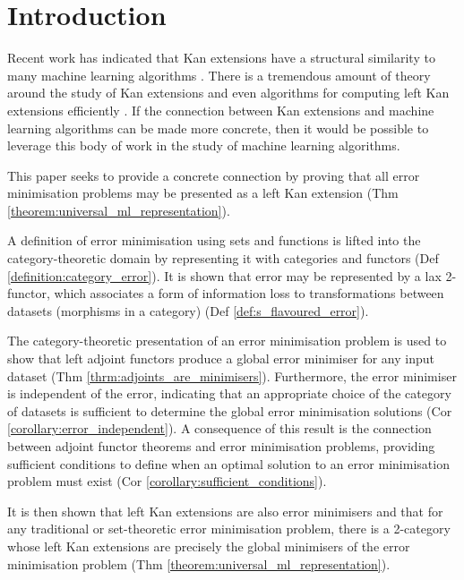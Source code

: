 \section{Introduction}

Recent work has indicated that Kan extensions have a structural similarity to many machine learning algorithms \cite{shieblerKanExtensionsData2022, pugh_using_2023}. There is a tremendous amount of theory around the study of Kan extensions \cite{perrone_kan_2022, Kelly2005} and even algorithms for computing left Kan extensions efficiently \cite{meyers_fast_2022}. If the connection between Kan extensions and machine learning algorithms can be made more concrete, then it would be possible to leverage this body of work in the study of machine learning algorithms. 

This paper seeks to provide a concrete connection by proving that all error minimisation problems may be presented as a left Kan extension (Thm \ref{theorem:universal_ml_representation}).

A definition of error minimisation using sets and functions is lifted into the category-theoretic domain by representing it with categories and functors (Def \ref{definition:category_error}). It is shown that error may be represented by a lax 2-functor, which associates a form of information loss to transformations between datasets (morphisms in a category) (Def \ref{def:s_flavoured_error}).

The category-theoretic presentation of an error minimisation problem is used to show that left adjoint functors produce a global error minimiser for any input dataset (Thm \ref{thrm:adjoints_are_minimisers}). Furthermore, the error minimiser is independent of the error, indicating that an appropriate choice of the category of datasets is sufficient to determine the global error minimisation solutions (Cor \ref{corollary:error_independent}). A consequence of this result is the connection between adjoint functor theorems \cite{porst_history_2024} and error minimisation problems, providing sufficient conditions to define when an optimal solution to an error minimisation problem must exist (Cor \ref{corollary:sufficient_conditions}).

It is then shown that left Kan extensions are also error minimisers and that for any traditional or set-theoretic error minimisation problem, there is a 2-category whose left Kan extensions are precisely the global minimisers of the error minimisation problem (Thm \ref{theorem:universal_ml_representation}).

